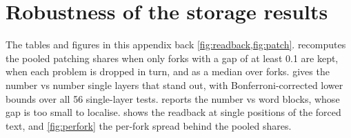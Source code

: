 \section{Robustness of the storage results}\label{app:robust}

The tables and figures in this appendix back \cref{fig:readback,fig:patch}.
 recomputes the pooled patching shares when only forks with a gap of at least 0.1 are kept, %
when each problem is dropped in turn, and as a median over forks.
 gives the number vs number single layers that stand out, with Bonferroni-corrected lower
bounds over all 56 single-layer tests. %
 reports the number vs word blocks, whose gap is too small to localise.
 shows the readback at single positions of the forced text, and \cref{fig:perfork} the
per-fork spread behind the pooled shares.

